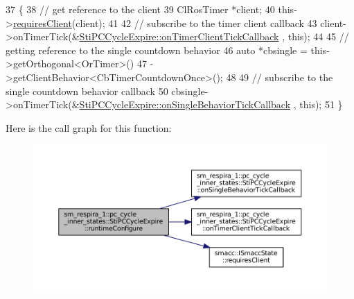 \begin{DoxyCode}
37   \{
38     \textcolor{comment}{// get reference to the client}
39     ClRosTimer *client;
40     this->\hyperlink{classsmacc_1_1ISmaccState_a7f95c9f0a6ea2d6f18d1aec0519de4ac}{requiresClient}(client);
41 
42     \textcolor{comment}{// subscribe to the timer client callback}
43     client->onTimerTick(&\hyperlink{structsm__respira__1_1_1pc__cycle__inner__states_1_1StiPCCycleExpire_a7fd642e0a6c10ef251fd3a6b8c8752ac}{StiPCCycleExpire::onTimerClientTickCallback}
      , \textcolor{keyword}{this});
44 
45     \textcolor{comment}{// getting reference to the single countdown behavior}
46     \textcolor{keyword}{auto} *cbsingle = this->getOrthogonal<OrTimer>()
47                           ->getClientBehavior<CbTimerCountdownOnce>();
48 
49     \textcolor{comment}{// subscribe to the single countdown behavior callback}
50     cbsingle->onTimerTick(&\hyperlink{structsm__respira__1_1_1pc__cycle__inner__states_1_1StiPCCycleExpire_a36833891f00ebabff74a5570627405a6}{StiPCCycleExpire::onSingleBehaviorTickCallback}
      , \textcolor{keyword}{this});
51   \}
\end{DoxyCode}
Here is the call graph for this function\+:
\nopagebreak
\begin{figure}[H]
\begin{center}
\leavevmode
\includegraphics[width=350pt]{structsm__respira__1_1_1pc__cycle__inner__states_1_1StiPCCycleExpire_a6fa2c541841c39b444f25fdd9b96f7b8_cgraph}
\end{center}
\end{figure}
\mbox{\label{structsm__respira__1_1_1pc__cycle__inner__states_1_1StiPCCycleExpire_a709afc5dd10c05efdd7bfe3f10de1e1d}} 
